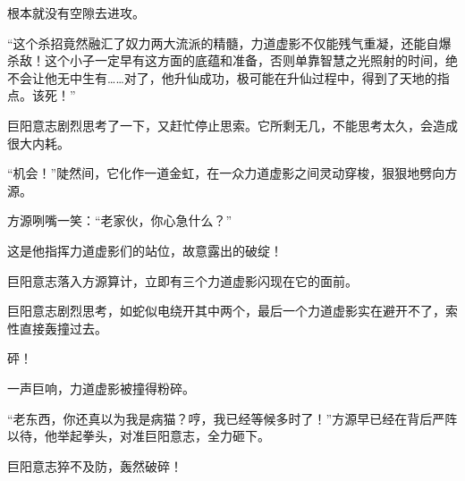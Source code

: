 \begin{this_body}
根本就没有空隙去进攻。

“这个杀招竟然融汇了奴力两大流派的精髓，力道虚影不仅能残气重凝，还能自爆杀敌！这个小子一定早有这方面的底蕴和准备，否则单靠智慧之光照射的时间，绝不会让他无中生有……对了，他升仙成功，极可能在升仙过程中，得到了天地的指点。该死！”

巨阳意志剧烈思考了一下，又赶忙停止思索。它所剩无几，不能思考太久，会造成很大内耗。

“机会！”陡然间，它化作一道金虹，在一众力道虚影之间灵动穿梭，狠狠地劈向方源。

方源咧嘴一笑：“老家伙，你心急什么？”

这是他指挥力道虚影们的站位，故意露出的破绽！

巨阳意志落入方源算计，立即有三个力道虚影闪现在它的面前。

巨阳意志剧烈思考，如蛇似电绕开其中两个，最后一个力道虚影实在避开不了，索性直接轰撞过去。

砰！

一声巨响，力道虚影被撞得粉碎。

“老东西，你还真以为我是病猫？哼，我已经等候多时了！”方源早已经在背后严阵以待，他举起拳头，对准巨阳意志，全力砸下。

巨阳意志猝不及防，轰然破碎！

\end{this_body}

